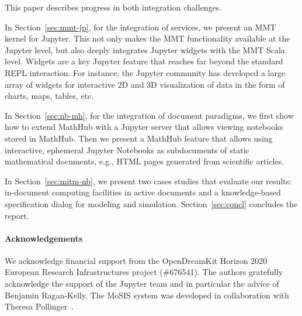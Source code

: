 This paper describes progress in both integration challenges.

In Section~\ref{sec:mmt-jp}, for the integration of services, we present an MMT kernel for Jupyter.
This not only makes the MMT functionality available at the Jupyter level, but also deeply integrates Jupyter widgets with the MMT Scala level.
Widgets are a key Jupyter feature that reaches far beyond the standard REPL interaction.
For instance, the Jupyter community has developed a large array of widgets for interactive 2D and 3D visualization of data in the form of charts, maps, tables, etc.

In Section~\ref{sec:nb-mh}, for the integration of document paradigms, we first show how to extend MathHub with a Jupyter server that allows viewing notebooks stored in MathHub.
Then we present a MathHub feature that allows using interactive, ephemeral Jupyter Notebooks as subdocuments of static mathematical documents, e.g., HTML pages generated from scientific articles.

In Section~\ref{sec:mitm-nb}, we present two cases studies that evaluate our results: in-document computing facilities in active documents and a knowledge-based specification dialog for modeling and simulation.
Section~\ref{sec:concl} concludes the report.

\paragraph{Acknowledgements}
We acknowledge financial support from the OpenDreamKit Horizon 2020 European Research Infrastructures project (\#676541).
The authors gratefully acknowledge the support of the Jupyter team and in particular the advice of Benjamin Ragan-Kelly.
The MoSIS system was developed in collaboration with Theresa Pollinger~\cite{PolKohKoe:kacse18}. 

